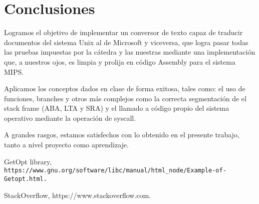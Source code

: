 \documentclass[a4paper]{article}
\begin{document}
\pagebreak


\section{Conclusiones}

Logramos el objetivo de implementar un conversor de texto capaz de traducir documentos del sistema Unix al de Microsoft y viceversa, que logra pasar todas las pruebas impuestas por la cátedra y las nuestras mediante una implementación que, a nuestros ojos, es limpia y prolija en código Assembly para el sistema MIPS. 

Aplicamos los conceptos dados en clase de forma exitosa, tales como: el uso de funciones, branches y otros más complejos como la correcta segmentación de el stack frame (ABA, LTA y SRA) y el llamado a código propio del sistema operativo mediante la operación de syscall. 

A grandes rasgos, estamos satisfechos con lo obtenido en el presente trabajo, tanto a nivel proyecto como aprendizaje.

\begin{thebibliography}{2}

 GetOpt library, 
\texttt{https://www.gnu.org/software/libc/manual/html_node/Example-of-Getopt.html.}

 StackOverflow, https://www.stackoverflow.com.

\end{thebibliography}
\end{document}

